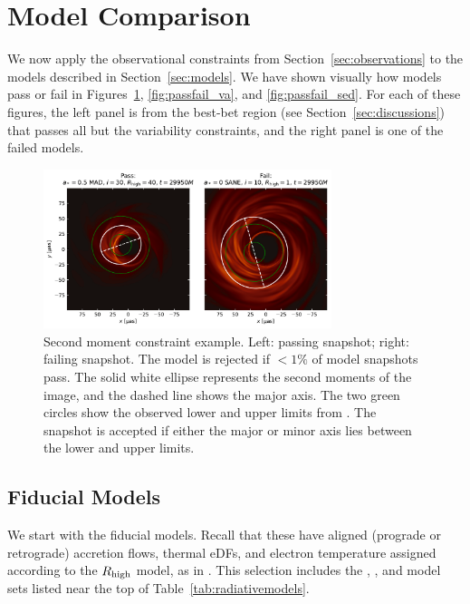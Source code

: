\section{Model Comparison}\label{sec:comparisons}

We now apply the observational constraints from Section~\ref{sec:observations} to the models described in Section~\ref{sec:models}.
We have shown visually how models pass or fail in Figures~\ref{fig:passfail_sz}, \ref{fig:passfail_va}, and \ref{fig:passfail_sed}.
For each of these figures, the left panel is from the best-bet region (see Section~\ref{sec:discussions}) that passes all but the variability constraints, and the right panel is one of the failed models.

\begin{figure}
  \centering
  \includegraphics[width=0.75\textwidth]{figures/passfail_sz.pdf}
  \caption{Second moment constraint example.
    Left: passing snapshot;
    right: failing snapshot.
    The model is rejected if $< 1\%$ of model snapshots pass.
    The solid white ellipse  represents the second moments of the image, and the dashed line shows the major axis.
    The two green circles show the observed lower and upper limits from .
    The snapshot is accepted if either the major or minor axis lies between the lower and upper limits.}
  \label{fig:passfail_sz}
\end{figure}

\subsection{Fiducial Models}\label{subsec:thermal}

We start with the fiducial models.
Recall that these have aligned (prograde or retrograde) accretion flows, thermal eDFs, and electron temperature assigned according to the $R_\mathrm{high}$ model, as in .
This selection includes the \kharma, \bhac, and \hamr model sets listed near the top of Table~\ref{tab:radiativemodels}.

